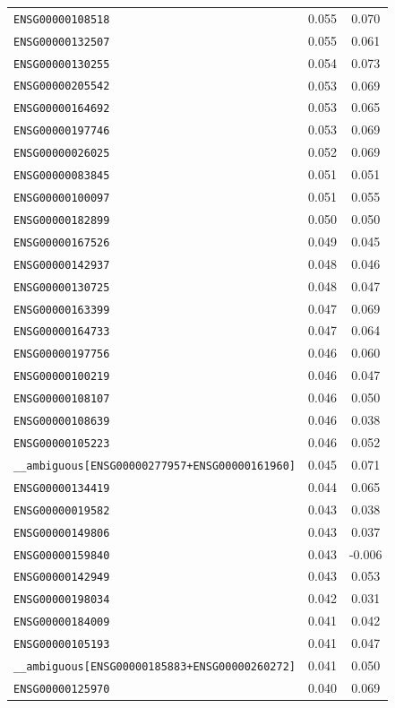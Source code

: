 \begin{longtable}{lcc}
\texttt{ENSG00000108518} & 0.055 & 0.070 \\
\texttt{ENSG00000132507} & 0.055 & 0.061 \\
\texttt{ENSG00000130255} & 0.054 & 0.073 \\
\texttt{ENSG00000205542} & 0.053 & 0.069 \\
\texttt{ENSG00000164692} & 0.053 & 0.065 \\
\texttt{ENSG00000197746} & 0.053 & 0.069 \\
\texttt{ENSG00000026025} & 0.052 & 0.069 \\
\texttt{ENSG00000083845} & 0.051 & 0.051 \\
\texttt{ENSG00000100097} & 0.051 & 0.055 \\
\texttt{ENSG00000182899} & 0.050 & 0.050 \\
\texttt{ENSG00000167526} & 0.049 & 0.045 \\
\texttt{ENSG00000142937} & 0.048 & 0.046 \\
\texttt{ENSG00000130725} & 0.048 & 0.047 \\
\texttt{ENSG00000163399} & 0.047 & 0.069 \\
\texttt{ENSG00000164733} & 0.047 & 0.064 \\
\texttt{ENSG00000197756} & 0.046 & 0.060 \\
\texttt{ENSG00000100219} & 0.046 & 0.047 \\
\texttt{ENSG00000108107} & 0.046 & 0.050 \\
\texttt{ENSG00000108639} & 0.046 & 0.038 \\
\texttt{ENSG00000105223} & 0.046 & 0.052 \\
\texttt{\_\_ambiguous[ENSG00000277957+ENSG00000161960]} & 0.045 & 0.071 \\
\texttt{ENSG00000134419} & 0.044 & 0.065 \\
\texttt{ENSG00000019582} & 0.043 & 0.038 \\
\texttt{ENSG00000149806} & 0.043 & 0.037 \\
\texttt{ENSG00000159840} & 0.043 & -0.006 \\
\texttt{ENSG00000142949} & 0.043 & 0.053 \\
\texttt{ENSG00000198034} & 0.042 & 0.031 \\
\texttt{ENSG00000184009} & 0.041 & 0.042 \\
\texttt{ENSG00000105193} & 0.041 & 0.047 \\
\texttt{\_\_ambiguous[ENSG00000185883+ENSG00000260272]} & 0.041 & 0.050 \\
\texttt{ENSG00000125970} & 0.040 & 0.069 \\

\end{longtable}

